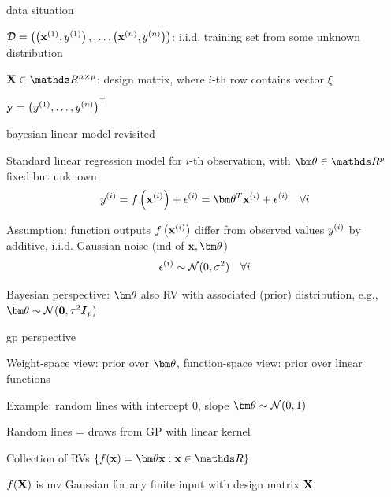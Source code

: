 \documentclass[11pt,compress,t,notes=noshow, xcolor=table]{beamer}
\begin{document}


\begin{framei}{data situation}
\item $\mathcal{D} = \left( \left(\mathbf{x}^{(1)}, y^{(1)}\right), \ldots, \left(\mathbf{x}^{(n)}, y^{(n)}\right)\right)$: i.i.d. training set from some unknown distribution
\item $\Xmat \in \R^{n \times p}$: design matrix, where $i$-th row contains vector $\xi$
\item $\mathbf{y} = \left(y^{(1)}, \hdots, y^{(n)}\right)^\top$
\end{framei}

\begin{framei}[sep=L]{bayesian linear model revisited}
\item Standard linear regression model for $i$-th observation, with $\thetav \in \R^p$ fixed but unknown
$$\yi = \fxi + \epsi = \thetav^T \xi + \epsi \quad \forall i$$
\item Assumption: function outputs $f\left(\mathbf{x}^{(i)}\right)$ differ from observed values $y^{(i)}$ by additive, i.i.d. Gaussian noise (ind of $\xv, \thetav$)
$$\epsilon^{(i)} \sim \mathcal{N}(0, \sigma^2) \quad \forall i$$ 
\item Bayesian perspective: $\thetav$ also RV with associated (prior) distribution, e.g., $\thetav \sim \normal(\zero, \tau^2 \id_p)$
\end{framei}

\begin{framei}{gp perspective}
\item Weight-space view: prior over $\thetav$, function-space view: prior over linear functions
\item Example: random lines with intercept 0, slope $\thetav \sim \normal(0, 1)$
\vfill
\item Random lines = draws from GP with linear kernel
\item Collection of RVs $\{ \fx = \thetav \xv: \xv \in \R\}$\item $f(\mathbf{X})$ is mv Gaussian for any finite input with design matrix $\mathbf{X}$
\end{framei}
\end{document}
